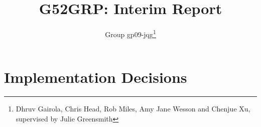 \documentclass[12pt]{article}
\title{G52GRP: Interim Report}
\author{Group gp09-jqg\thanks{Dhruv Gairola, Chris Head, Rob Miles, Amy Jane Wesson and Chenjue Xu, supervised by Julie Greensmith}} %
\begin{document}
\maketitle


\section{Implementation Decisions}

\end{document}
